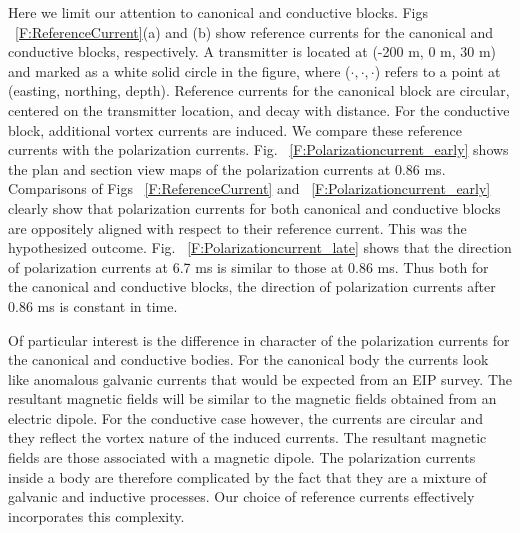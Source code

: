 \documentclass[extra,mreferee]{gji}
\begin{document}
Here we limit our attention to canonical and conductive blocks.
Figs ~\ref{F:ReferenceCurrent}(a)   and (b) show reference currents for the canonical and conductive blocks, respectively.
A transmitter is located at (-200 m, 0 m, 30 m) and marked as a white solid circle in the figure, where ($\cdot, \cdot, \cdot$) refers to a point at (easting, northing, depth).
Reference currents for the canonical block are circular, centered on the transmitter location, and decay with distance.
For the conductive block, additional vortex currents are induced.
We compare these reference currents with the polarization currents.
Fig. ~\ref{F:Polarizationcurrent_early} shows the plan and section view maps of the polarization currents at 0.86 ms.
Comparisons of Figs ~\ref{F:ReferenceCurrent} and ~\ref{F:Polarizationcurrent_early} clearly show that polarization currents for both canonical and conductive blocks are oppositely aligned with respect to their reference current. This was the hypothesized outcome.
Fig. ~\ref{F:Polarizationcurrent_late} shows that the direction of polarization currents at 6.7 ms is similar to those at 0.86 ms. Thus both for the canonical and conductive blocks, the direction of polarization currents after 0.86 ms is constant in time.

Of  particular interest is the difference in character of the polarization currents for the canonical and conductive bodies. For the canonical body the currents look like anomalous galvanic currents that would be expected from an EIP survey. The resultant magnetic fields will be similar to the magnetic fields obtained from an electric dipole. For the conductive case however, the currents are circular and they reflect the vortex nature of the induced currents. The resultant magnetic fields are those associated with a magnetic dipole. The polarization currents inside a body are therefore complicated by the fact that they are a mixture of galvanic and inductive processes. Our choice of reference currents effectively incorporates this complexity.



\end{document}
